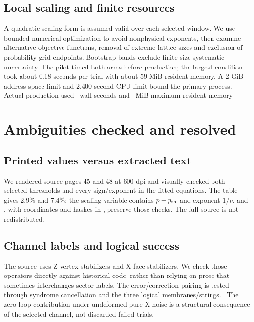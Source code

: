 \subsection{Local scaling and finite resources}
A quadratic scaling form is assumed valid over each selected window. We use bounded numerical optimization to avoid nonphysical exponents, then examine alternative objective functions, removal of extreme lattice sizes and exclusion of probability-grid endpoints. Bootstrap bands exclude finite-size systematic uncertainty. The pilot timed both arms before production; the largest condition took about 0.18 seconds per trial with about 59 MiB resident memory. A 2 GiB address-space limit and 2,400-second CPU limit bound the primary process. Actual production used \RunSeconds\ wall seconds and \RunMemory\ MiB maximum resident memory.

\section{Ambiguities checked and resolved}
\subsection{Printed values versus extracted text}
We rendered source pages 45 and 48 at 600 dpi and visually checked both selected thresholds and every sign/exponent in the fitted equations. The table gives 2.9\% and 7.4\%; the scaling variable contains $p-p_{\rm th}$ and exponent $1/\nu$.  and , with coordinates and hashes in , preserve those checks. The full source is not redistributed.

\subsection{Channel labels and logical success}
The source uses Z vertex stabilizers and X face stabilizers. We check those operators directly against historical code, rather than relying on prose that sometimes interchanges sector labels. The error/correction pairing is tested through syndrome cancellation and the three logical membranes/strings. \InvalidStatus\ The zero-loop contribution under undeformed pure-X noise is a structural consequence of the selected channel, not discarded failed trials.

